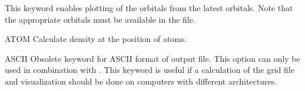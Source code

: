 \begin{keywordlist}
This keyword enables plotting of the orbitals from the latest  orbitals.
Note that the appropriate  orbitals must be available in the  file.
\item[ATOM]
 Calculate density at the position of atoms.
\item[ASCII]
Obsolete keyword for ASCII format of output file. This option can only
be used in combination with .
This keyword is useful if a calculation
of the grid file and visualization should be done on computers with
different architectures. 


\end{keywordlist}
